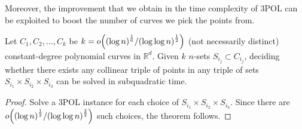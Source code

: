 Moreover, the improvement that we obtain in the time complexity of 3POL
can be exploited to boost the number of curves we pick the points from.
\begin{theorem}
	Let $C_1,C_2,\ldots,C_k$ be $k=o\mleft({(\log n)}^\frac{1}{6}/{(\log \log
	n)}^\frac{1}{2}\mright)$
	(not necessarily distinct)
	constant-degree polynomial curves in $\mathbb{R}^d$.
	Given $k$ $n$-sets $S_{i_j} \subset C_{i_j}$,
	deciding whether there exists any collinear
	triple of points in any triple of sets $S_{i_1} \times S_{i_2} \times
	S_{i_3}$ can be solved in subquadratic time.
\end{theorem}
\begin{proof}
	Solve a 3POL instance for each choice of $S_{i_1} \times S_{i_2} \times
	S_{i_3}$. Since there are
	$o\mleft({(\log n)}^\frac{1}{2}/{(\log \log n)}^\frac{3}{2}\mright)$
	such choices, the theorem follows.
\end{proof}

